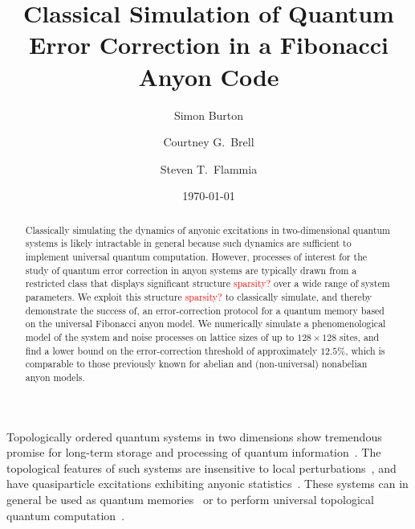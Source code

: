 \documentclass[aps, prl, letterpaper, twocolumn, superscriptaddress, notitlepage, 10pt]{revtex4}
\newcommand{\dude}[1]{\textcolor{red}{#1}}
\begin{document}
\title{Classical Simulation of Quantum Error Correction in a Fibonacci Anyon Code}

\author{Simon Burton}
\author{Courtney G.\ Brell}
\author{Steven T.\ Flammia}

\date{\today}

\begin{abstract}
Classically simulating the dynamics of anyonic excitations in two-dimensional quantum systems is likely intractable in general because such dynamics are sufficient to implement 
universal quantum computation. However, processes of interest for the study of quantum 
error correction in anyon systems are typically drawn from a restricted class that displays 
significant structure \dude{sparsity?} over a wide range of system parameters.
We exploit this structure \dude{sparsity?} to classically simulate, and thereby demonstrate the success of, an 
error-correction protocol for a quantum memory based on the universal Fibonacci anyon 
model.  We numerically simulate a phenomenological model of the system and noise 
processes on lattice sizes of up to 
$128\times128$ sites, and find a lower bound on the error-correction threshold of 
approximately $12.5\%$, which is comparable to those previously known for abelian and 
(non-universal) nonabelian anyon models.
\end{abstract}

\maketitle


Topologically ordered quantum systems in two dimensions show tremendous promise for 
long-term storage and processing of quantum information~\cite{Kitaev2003, Dennis2002, Nayak2008}. 
The topological features of such systems are insensitive to local 
perturbations~\cite{Bravyi2010, Bravyi2011a, Michalakis2013}, and have quasiparticle excitations 
exhibiting anyonic statistics~\cite{Wilczek1990}. These systems can in general be used as 
quantum memories~\cite{Kitaev2003, Dennis2002} or to perform universal topological 
quantum computation~\cite{Freedman2002, Nayak2008}.
\end{document}
